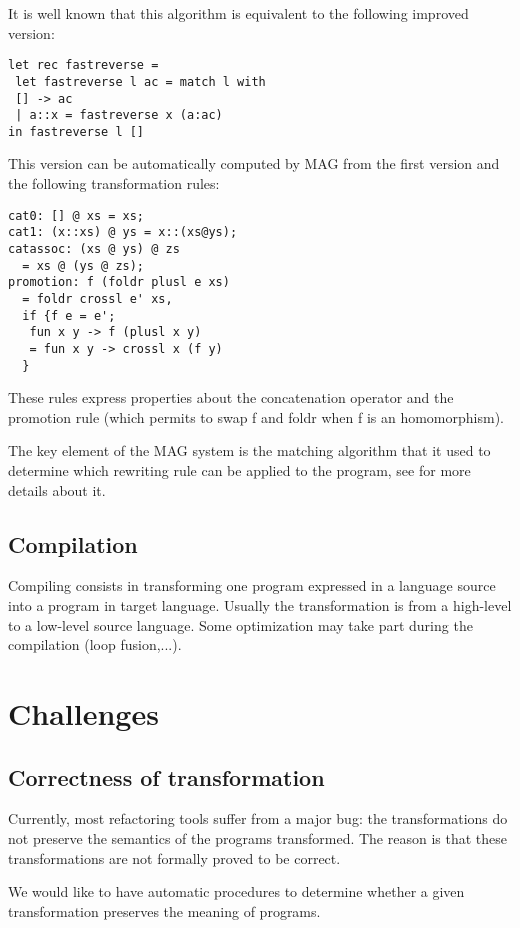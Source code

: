\documentclass[10pt,twocolumn]{article}
\begin{document}
It is well known that this algorithm is equivalent to the following improved version:
\begin{lstlisting}
let rec fastreverse =
 let fastreverse l ac = match l with
 [] -> ac
 | a::x = fastreverse x (a:ac)
in fastreverse l []
\end{lstlisting}

This version can be automatically computed by MAG from the first version and the following transformation rules:

\begin{lstlisting}
cat0: [] @ xs = xs;
cat1: (x::xs) @ ys = x::(xs@ys);
catassoc: (xs @ ys) @ zs
  = xs @ (ys @ zs);
promotion: f (foldr plusl e xs)
  = foldr crossl e' xs,
  if {f e = e';
   fun x y -> f (plusl x y)
   = fun x y -> crossl x (f y)
  }
\end{lstlisting}

These rules express properties about the concatenation operator and the promotion rule (which permits to swap f and foldr
when f is an homomorphism).

The key element of the MAG system is the matching algorithm that it used to determine which rewriting rule can be applied to the program,
see \cite{sittampthesis} for more details about it.

\subsection{Compilation}

Compiling consists in transforming one program expressed in a
language source into a program in target language. Usually the
transformation is from a high-level to a low-level source language.
Some optimization may take part during the compilation (loop fusion,...).

\section{Challenges}

\subsection{Correctness of transformation}

Currently, most refactoring tools suffer from a major bug: the
transformations do not preserve the semantics of the programs
transformed. The reason is that these transformations are not
formally proved to be correct.

We would like to have automatic procedures to determine whether a
given transformation preserves the meaning of programs.
\end{document}

